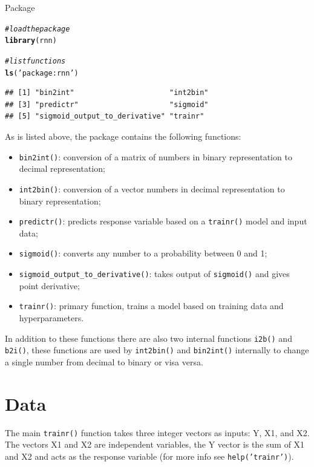 \documentclass[british]{article}\usepackage[]{graphicx}\usepackage[]{color}
\makeatletter
\newcommand{\hlstr}[1]{\textcolor[rgb]{0.192,0.494,0.8}{#1}}%
\newcommand{\hlcom}[1]{\textcolor[rgb]{0.678,0.584,0.686}{\textit{#1}}}%
\newcommand{\hlstd}[1]{\textcolor[rgb]{0.345,0.345,0.345}{#1}}%
\newcommand{\hlkwd}[1]{\textcolor[rgb]{0.737,0.353,0.396}{\textbf{#1}}}%
\newenvironment{kframe}{%
 \def\at@end@of@kframe{}%
 \ifinner\ifhmode%
  \def\at@end@of@kframe{\end{minipage}}%
  \begin{minipage}{\columnwidth}%
 \fi\fi%
 \def\FrameCommand##1{\hskip\@totalleftmargin \hskip-\fboxsep
 \colorbox{shadecolor}{##1}\hskip-\fboxsep
     \hskip-\linewidth \hskip-\@totalleftmargin \hskip\columnwidth}%
 \MakeFramed {\advance\hsize-\width
   \@totalleftmargin\z@ \linewidth\hsize
   \@setminipage}}%
 {\par\unskip\endMakeFramed%
 \at@end@of@kframe}
\newenvironment{knitrout}{}{} %
\newcommand{\code}[1]{\texttt{#1}}
\makeatother
\begin{document}
\begin{table}[H]
\caption{Package}


\begin{knitrout}
\color{fgcolor}\begin{kframe}
\begin{alltt}
\hlcom{# load the package}
\hlkwd{library}\hlstd{(rnn)}

\hlcom{# list functions}
\hlkwd{ls}\hlstd{(}\hlstr{'package:rnn'}\hlstd{)}
\end{alltt}
\begin{verbatim}
## [1] "bin2int"                      "int2bin"                     
## [3] "predictr"                     "sigmoid"                     
## [5] "sigmoid_output_to_derivative" "trainr"
\end{verbatim}
\end{kframe}
\end{knitrout}
\end{table}


As is listed above, the package contains the following functions:
\begin{itemize}
\item \code{bin2int()}: conversion of a matrix of numbers in binary representation
to decimal representation;
\item \code{int2bin()}: conversion of a vector numbers in decimal representation
to binary representation;
\item \code{predictr()}: predicts response variable based on a \code{trainr()}
model and input data;
\item \code{sigmoid()}: converts any number to a probability between 0
and 1;
\item \code{sigmoid\_output\_to\_derivative()}: takes output of \code{sigmoid()}
and gives point derivative;
\item \code{trainr()}: primary function, trains a model based on training
data and hyperparameters.
\end{itemize}
In addition to these functions there are also two internal functions
\code{i2b()} and \code{b2i()}, these functions are used by \code{int2bin()}
and \code{bin2int()} internally to change a single number from decimal
to binary or visa versa.


\section{Data}

The main \code{trainr()} function takes three integer vectors as
inputs: Y, X1, and X2. The vectors X1 and X2 are independent variables,
the Y vector is the sum of X1 and X2 and acts as the response variable
(for more info see \code{help('trainr')}).
\end{document}
